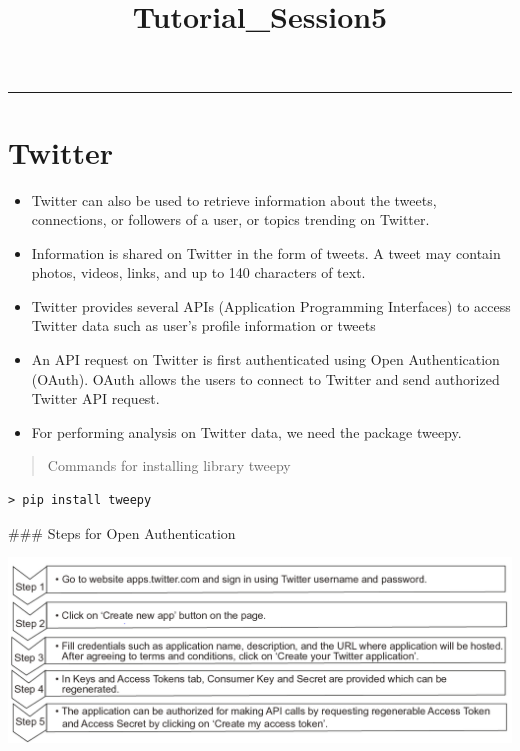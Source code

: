 \documentclass[11pt]{article}
\title{Tutorial\_Session5}
\makeatletter
\def\maxwidth{\ifdim\Gin@nat@width>\linewidth\linewidth
    \else\Gin@nat@width\fi}
\let\Oldincludegraphics\includegraphics
\renewcommand{\includegraphics}[1]{\Oldincludegraphics[width=.8\maxwidth]{#1}}
\providecommand{\tightlist}{%
      \setlength{\itemsep}{0pt}\setlength{\parskip}{0pt}}
\makeatother
\begin{document}
    
    
    \maketitle
    
    

    
    \begin{center}\rule{0.5\linewidth}{\linethickness}\end{center}

\section{ Twitter }\label{twitter}

\begin{itemize}
\tightlist
\item
  Twitter can also be used to retrieve information about the tweets,
  connections, or followers of a user, or topics trending on Twitter.
\item
  Information is shared on Twitter in the form of tweets. A tweet may
  contain photos, videos, links, and up to 140 characters of text.
\item
  Twitter provides several APIs (Application Programming Interfaces) to
  access Twitter data such as user's profile information or tweets
\item
  An API request on Twitter is first authenticated using Open
  Authentication (OAuth). OAuth allows the users to connect to Twitter
  and send authorized Twitter API request.
\item
  For performing analysis on Twitter data, we need the package tweepy.
\end{itemize}

\begin{quote}
Commands for installing library tweepy
\end{quote}

\begin{verbatim}
> pip install tweepy
\end{verbatim}

 \#\#\# Steps for Open Authentication 

    \includegraphics{1.png}
\end{document}
